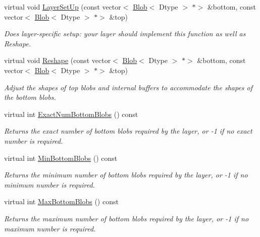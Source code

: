 \begin{DoxyCompactItemize}
\item 
virtual void \mbox{\hyperlink{classcaffe_1_1_infogain_loss_layer_ae59c01de80f22c87c1dd2ef87c6e6a2f}{Layer\+Set\+Up}} (const vector$<$ \mbox{\hyperlink{classcaffe_1_1_blob}{Blob}}$<$ Dtype $>$ $\ast$$>$ \&bottom, const vector$<$ \mbox{\hyperlink{classcaffe_1_1_blob}{Blob}}$<$ Dtype $>$ $\ast$$>$ \&top)
\begin{DoxyCompactList}\small\item\em Does layer-\/specific setup\+: your layer should implement this function as well as Reshape. \end{DoxyCompactList}\item 
virtual void \mbox{\hyperlink{classcaffe_1_1_infogain_loss_layer_aa2903026b3886816270deb038a463759}{Reshape}} (const vector$<$ \mbox{\hyperlink{classcaffe_1_1_blob}{Blob}}$<$ Dtype $>$ $\ast$$>$ \&bottom, const vector$<$ \mbox{\hyperlink{classcaffe_1_1_blob}{Blob}}$<$ Dtype $>$ $\ast$$>$ \&top)
\begin{DoxyCompactList}\small\item\em Adjust the shapes of top blobs and internal buffers to accommodate the shapes of the bottom blobs. \end{DoxyCompactList}\item 
virtual int \mbox{\hyperlink{classcaffe_1_1_infogain_loss_layer_aa03732f381764180748479c83b289869}{Exact\+Num\+Bottom\+Blobs}} () const
\begin{DoxyCompactList}\small\item\em Returns the exact number of bottom blobs required by the layer, or -\/1 if no exact number is required. \end{DoxyCompactList}\item 
virtual int \mbox{\hyperlink{classcaffe_1_1_infogain_loss_layer_ad8a1ef702a695e379e5d0450369b4a0c}{Min\+Bottom\+Blobs}} () const
\begin{DoxyCompactList}\small\item\em Returns the minimum number of bottom blobs required by the layer, or -\/1 if no minimum number is required. \end{DoxyCompactList}\item 
virtual int \mbox{\hyperlink{classcaffe_1_1_infogain_loss_layer_a9b2372959a16da1e80ae7a98b7689a4c}{Max\+Bottom\+Blobs}} () const
\begin{DoxyCompactList}\small\item\em Returns the maximum number of bottom blobs required by the layer, or -\/1 if no maximum number is required. \end{DoxyCompactList}\item 

\end{DoxyCompactItemize}
